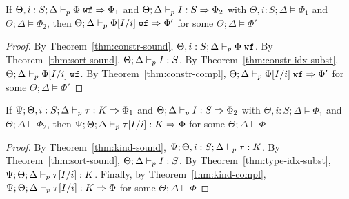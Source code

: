 \begin{theorem}
If $\Theta, i : S; \Delta \vdash_p \Phi \; \texttt{wf} \Rightarrow \Phi_1$ and $\Theta ; \Delta \vdash_p I : S \Rightarrow \Phi_2$
with $\Theta, i : S ; \Delta \vDash \Phi_1$ and $\Theta ; \Delta \vDash \Phi_2$, then
$\Theta ; \Delta \vdash_p  \Phi[I/i] \; \texttt{wf} \Rightarrow \Phi'$ for some $\Theta ; \Delta \vDash \Phi'$
\label{thm:constr-idx-algo-subst}
\end{theorem}
\begin{proof}
By Theorem~\ref{thm:constr-sound}, $\Theta, i : S ; \Delta \vdash_p \Phi \; \texttt{wf}$.
By Theorem~\ref{thm:sort-sound}, $\Theta ; \Delta \vdash_p I : S$.
By Theorem~\ref{thm:constr-idx-subst}, $\Theta ; \Delta \vdash_p \Phi[I/i] \; \texttt{wf}$.
By Theorem~\ref{thm:constr-compl}, $\Theta ; \Delta \vdash_p \Phi[I/i] \; \texttt{wf} \Rightarrow \Phi'$ for some $\Theta ; \Delta \vDash \Phi'$
\end{proof}

\begin{theorem}
If $\Psi ; \Theta, i : S ; \Delta \vdash_p \tau : K \Rightarrow \Phi_1$ and $\Theta ; \Delta \vdash_p I : S \Rightarrow \Phi_2$ 
with $\Theta, i : S ; \Delta \vDash \Phi_1$ and $\Theta ; \Delta \vDash \Phi_2$, then
$\Psi ; \Theta ; \Delta \vdash_p \tau[I/i] : K \Rightarrow \Phi$ for some $\Theta ; \Delta \vDash \Phi$
\label{thm:type-idx-algo-subst}
\end{theorem}
\begin{proof}
By Theorem~\ref{thm:kind-sound}, $\Psi ; \Theta, i : S ; \Delta \vdash_p \tau : K$.
By Theorem~\ref{thm:sort-sound}, $\Theta ; \Delta \vdash_p I : S$.
By Theorem~\ref{thm:type-idx-subst}, $\Psi ; \Theta ; \Delta \vdash_p \tau[I/i] : K$.
Finally, by Theorem~\ref{thm:kind-compl}, $\Psi ; \Theta ; \Delta \vdash_p \tau[I/i] : K \Rightarrow \Phi$ for some $\Theta ; \Delta \vDash \Phi$
\end{proof}

\subtynfidxsubst*

